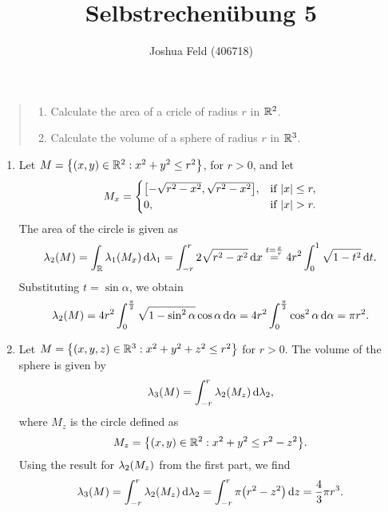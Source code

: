 \documentclass{exercise}
\title{Selbstrechenübung 5}
\author{Joshua Feld (406718)}
\begin{document}
	\maketitle


	\section{}

	\begin{quote}
		\begin{enumerate}
			\item Calculate the area of a cricle of radius \(r\) in \(\R^2\).
			\item Calculate the volume of a sphere of radius \(r\) in \(\R^3\).
		\end{enumerate}
	\end{quote}

	\begin{enumerate}
		\item Let \(M = \braces*{\parentheses*{x, y} \in \R^2 : x^2 + y^2 \le r^2}\), for \(r > 0\), and let
		\[
			M_x = \begin{cases}
				\brackets*{-\sqrt{r^2 - x^2}, \sqrt{r^2 - x^2}}, & \text{if }\absolute*{x} \le r,\\
				0, & \text{if }\absolute*{x} > r.
			\end{cases}
		\]
		The area of the circle is given as
		\[
			\lambda_2\parentheses*{M} = \int_\R \lambda_1\parentheses*{M_x}\d \lambda_1 = \int_{-r}^r 2\sqrt{r^2 - x^2}\d x \stackrel{t = \frac{x}{r}}{=} 4r^2 \int_0^1 \sqrt{1 - t^2}\d t.
		\]
		Substituting \(t = \sin\alpha\), we obtain
		\[
			\lambda_2\parentheses*{M} = 4r^2 \int_0^{\frac{\pi}{2}}\sqrt{1 - \sin^2 \alpha}\cos\alpha\d\alpha = 4r^2 \int_0^{\frac{\pi}{2}}\cos^2 \alpha\d\alpha = \pi r^2.
		\]
		\item Let \(M = \braces*{\parentheses*{x, y, z} \in \R^3 : x^2 + y^2 + z^2 \le r^2}\) for \(r > 0\).
		The volume of the sphere is given by
		\[
			\lambda_3\parentheses*{M} = \int_{-r}^r \lambda_2\parentheses*{M_z}\d\lambda_2,
		\]
		where \(M_z\) is the circle defined as
		\[
			M_z = \braces*{\parentheses*{x, y} \in \R^2 : x^2 + y^2 \le r^2 - z^2}.
		\]
		Using the result for \(\lambda_2\parentheses*{M_z}\) from the first part, we find
		\[
			\lambda_3\parentheses*{M} = \int_{-r}^r \lambda_2\parentheses*{M_z}\d\lambda_2 = \int_{-r}^r \pi\parentheses*{r^2 - z^2}\d z = \frac{4}{3}\pi r^3.
		\]
	\end{enumerate}


	\section{}
\end{document}
